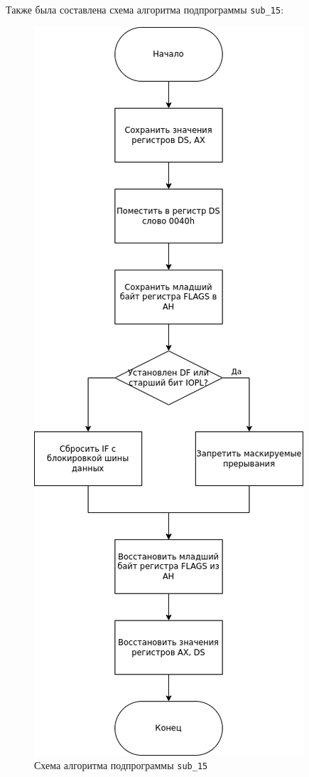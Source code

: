 \documentclass[
]{article}
\begin{document}
Также была составлена схема алгоритма подпрограммы \texttt{sub\_15}:

\begin{figure}
\centering
\includegraphics{img/fig-03.png}
\caption{Схема алгоритма подпрограммы \texttt{sub\_15}}
\end{figure}
\end{document}
